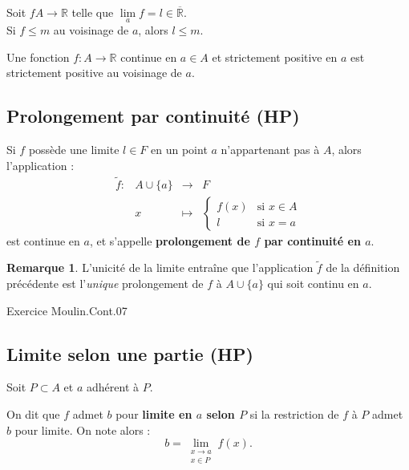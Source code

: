 \documentclass[french]{article}
\newcommand{\R}{\mathbb{R}}
\theoremstyle{plain}
\theoremstyle{definition}
\newtheorem*{rmq}{Remarque}
\theoremstyle{remark}
\begin{document}
\begin{cor}%
	Soit $fA\to\R$ telle que $\underset{a}{\lim}f=l\in\overline{\R}$. \\
	Si $f\leqslant m$ au voisinage de $a$, alors $l\leqslant m$.
\end{cor}

\begin{cor}%
	Une fonction $f:A\to\R$ continue en $a\in A$ et strictement positive en $a$ est strictement positive au voisinage de $a$.
\end{cor}

\subsection{Prolongement par continuité (HP)}

\begin{dfn}
	Si $f$ possède une limite $l\in F$ en un point $a$ n'appartenant pas à $A$, alors l'application : $$\begin{array}{lrcl}
		\tilde{f}:&A\cup\{a\}&\longrightarrow&F\\
		&x&\longmapsto&\displaystyle\begin{cases}
			f(x)&\text{si  }x\in A\\
			l&\text{si  }x=a
		\end{cases}
	\end{array}$$ est continue en $a$, et s'appelle \textbf{prolongement de $f$ par continuité en $a$}.
\end{dfn}

\begin{rmq}
	L'unicité de la limite entraîne que l'application $\tilde{f}$ de la définition précédente est l'\textit{unique} prolongement de $f$ à $A\cup\{a\}$ qui soit continu en $a$.
\end{rmq}

Exercice Moulin.Cont.07

\subsection{Limite selon une partie (HP)}

Soit $P\subset A$ et $a$ adhérent à $P$.

\begin{dfn}
	On dit que $f$ admet $b$ pour \textbf{limite en $a$ selon $P$} si la restriction de $f$ à $P$ admet $b$ pour limite. On note alors : $$b=\underset{\substack{x\to a\\ x\in P}}{\lim}f(x).$$
\end{dfn}
\end{document}
